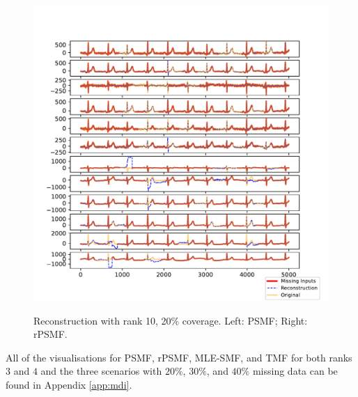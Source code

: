\documentclass{mldsmsc}
\begin{document}
\begin{figure}[H]
\begin{minipage}{0.4\linewidth}
    \includegraphics[width=\linewidth]{images/missing/rpsmf_output_20_10.pdf}
    \label{fig:augmented}
\end{minipage}
\caption{Reconstruction with rank 10, 20\% coverage. Left: PSMF; Right: rPSMF.}
\label{fig:mrec10}
\end{figure}

\noindent All of the visualisations for PSMF, rPSMF, MLE-SMF, and TMF for both ranks $3$ and $4$ and the three scenarios with $20\%$, $30\%$, and $40\%$ missing data can be found in Appendix \ref{app:mdi}. \newline
\end{document}
